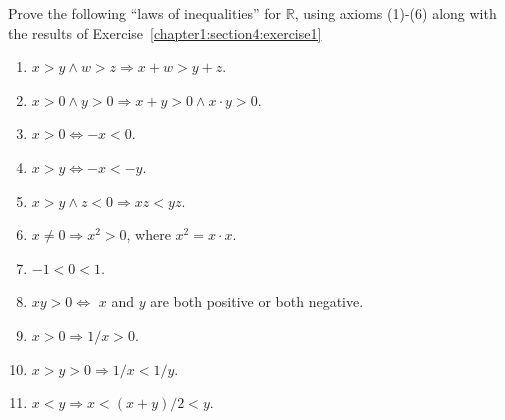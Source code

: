 \begin{exercise}\label{chapter1:section4:exercise2}
    Prove the following ``laws of inequalities'' for $\mathbb{R}$, using axioms {(1)}-{(6)} along with the results of Exercise~\ref{chapter1:section4:exercise1}
    \begin{enumerate}[label={(\alph*)}]
        \item $x > y \land w > z \Rightarrow x + w > y + z$.
        \item $x > 0 \land y > 0 \Rightarrow x + y > 0 \land x\cdot y > 0$.
        \item $x > 0 \Leftrightarrow -x < 0$.
        \item $x > y \Leftrightarrow -x < -y$.
        \item $x > y\land z < 0\Rightarrow xz < yz$.
        \item $x\ne 0 \Rightarrow x^{2} > 0$, where $x^{2} = x\cdot x$.
        \item $-1 < 0 < 1$.
        \item $xy > 0 \Leftrightarrow $ $x$ and $y$ are both positive or both negative.
        \item $x > 0 \Rightarrow 1/x > 0$.
        \item $x > y > 0 \Rightarrow 1/x < 1/y$.
        \item $x < y \Rightarrow x < (x + y)/2 < y$.
    \end{enumerate}
\end{exercise}

